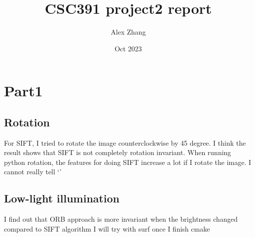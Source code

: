 \documentclass{article}
\title{CSC391 project2 report}
\author{Alex Zhang}
\date{Oct 2023}
\begin{document}
\maketitle
\section*{Part1}
\subsection*{Rotation}
For SIFT, I tried to rotate the image counterclockwise by 45 degree.
I think the result shows that SIFT is not completely rotation invariant. 
When running python rotation, the features for doing SIFT increase a lot if I rotate the image.
I cannot really tell 
`'
\subsection*{Low-light illumination}



I find out that ORB approach is more invariant when the brightness changed compared to SIFT algorithm
I will try with surf once I finish cmake
\end{document}
